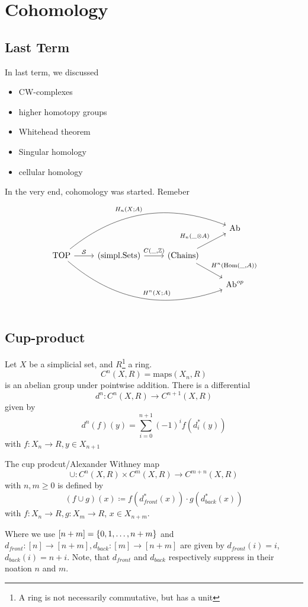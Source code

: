 \documentclass[language=english]{TemplateLecture}
\begin{document}
\setcounter{chapter}{0}
\chapter{Cohomology}


\section{Last Term}

In last term, we discussed
\begin{itemize}
    \item CW-complexes
    \item higher homotopy groups
    \item Whitehead theorem 
    \item Singular homology
    \item cellular homology
\end{itemize}

In the very end, cohomology was started. Remeber
\[\begin{tikzcd}
    & & & \mathrm{Ab} \\
    \mathrm{TOP} \ar[rrru, bend left, "H_n(X;A)"] \ar[rrrd, bend right, "H^n(X;A)"] \ar[r, "\cS"] & (\mathrm{simpl. Sets}) \ar[r, "{C(\_, \IZ)}"] & (\mathrm{Chains}) \ar[ru, "H_n(\_ \otimes A)"] \ar[rd, "{H^n(\Hom(\_, A))}"] & \\
    & & & \mathrm{Ab}^{op} \\
\end{tikzcd}\]

\section{Cup-product}


Let \(X\) be a simplicial set, and \(R\)\footnote{A ring is not necessarily commutative, but has a unit} a ring.
\[C^n(X, R) = \mathrm{maps}(X_n, R)\]
is an abelian group under pointwise addition. There is a differential
\[d^n\colon C^n(X,R) \to C^{n+1}(X,R)\]
given by
\[d^n(f)(y) = \sum_{i = 0}^{n+1}(-1)^{i} f(d_i^*(y))\]
with \(f\colon X_n \to R, y \in X_{n+1}\)


\begin{construction}
    The cup prodcut/Alexander Withney map
    \[\cup\colon C^n(X,R) \times C^m(X,R) \to C^{m+n}(X,R)\]
    with \(n,m \geq 0\) is defined by
    \[(f\cup g)(x)\coloneq f(d_{front}^*(x)) \cdot g(d_{back}^*(x))\]
    with \(f\colon X_n \to R, g\colon X_m \to R\), \(x \in X_{n+m}\).

    Where we use \([n+m] = \{0,1,\dots, n+m\}\) and \(d_{front} \colon [n] \to [n+m], d_{back}\colon [m]\to [n+m]\) are given by \(d_{front}(i) = i\), \(d_{back}(i) = n+i\). Note, that \(d_{front}\) and \(d_{back}\) respectively suppress in their noation \(n\) and \(m\).
\end{construction}
\end{document}
